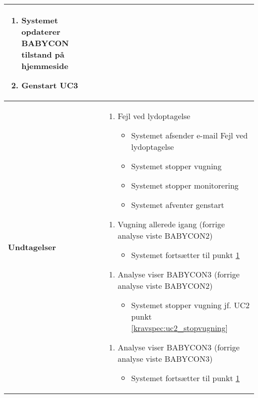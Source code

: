 \begin{center}
\begin{longtable}{|p{5cm}|p{9cm}|}
\begin{enumerate}
				\item \label{kravspec:uc3_opdatering}Systemet opdaterer BABYCON tilstand på hjemmeside 	
				\newline [Und: \ref{kravspec:uc3_opdatering}.a Ingen netværksforbindelse]			
				
				\item Genstart UC3				
				
			\end{enumerate}
		\\\hline
		\textbf{Undtagelser}
			&\begin{enumerate}[label=\ref{kravspec:uc3_optagelse}.a]
			\item Fejl ved lydoptagelse
					\begin{itemize}
					\item Systemet afsender e-mail Fejl ved lydoptagelse
					\item Systemet stopper vugning
					\item Systemet stopper monitorering
					\item Systemet afventer genstart
					\end{itemize}
			\end{enumerate}
			\begin{enumerate}[label=\ref{kravspec:uc3_lydanalyse}.a]
			\item Vugning allerede igang (forrige analyse viste BABYCON2)
					\begin{itemize}
					\item Systemet fortsætter til punkt \ref{kravspec:uc3_opdatering}
					\end{itemize}
			\end{enumerate}
			\begin{enumerate}[label=\ref{kravspec:uc3_lydanalyse}.b]
			\item Analyse viser BABYCON3 (forrige analyse viste BABYCON2)
					\begin{itemize}
					\item Systemet stopper vugning jf. UC2 punkt \ref{kravspec:uc2_stopvugning}
					\end{itemize}
			\end{enumerate}
			\begin{enumerate}[label=\ref{kravspec:uc3_lydanalyse}.c]
			\item Analyse viser BABYCON3 (forrige analyse viste BABYCON3)
					\begin{itemize}
					\item Systemet fortsætter til punkt \ref{kravspec:uc3_opdatering}

\end{itemize}
\end{enumerate}
\end{longtable}
\end{center}
